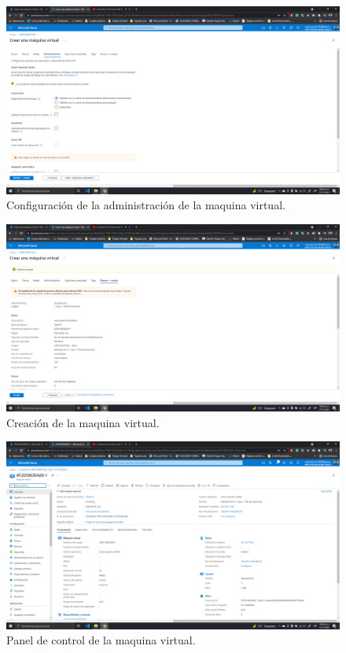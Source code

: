 \documentclass[11pt]{article}
\begin{document}
		\begin{figure}[H]
			\centering
			\includegraphics[scale=0.34]{resources/admin1.png}
			\caption{Configuración de la administración de la maquina virtual.}\label{fig:picture}
		\end{figure}
		\begin{figure}[H]
			\centering
			\includegraphics[scale=0.34]{resources/revisarycrear1.png}
			\caption{Creación de la maquina virtual.}\label{fig:picture}
		\end{figure}
		\begin{figure}[H]
			\centering
			\includegraphics[scale=0.34]{resources/paneldecontrol1.png}
			\caption{Panel de control de la maquina virtual.}\label{fig:picture}
		\end{figure}
\end{document}
